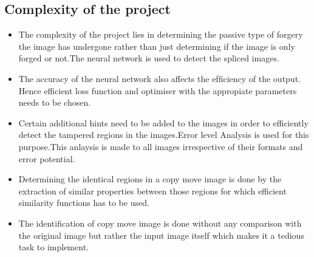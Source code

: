 \subsection{Complexity of the project}
\begin{itemize}
    \item  The complexity of the project lies in determining the passive type of forgery the image has undergone  rather than just determining if the image is only forged or not.The neural network is used to detect the spliced images.
    \item The accuracy of the neural network also affects the efﬁciency of the output. Hence efficient loss function and optimiser with the appropiate parameters needs to be chosen. 
    \item Certain additional hints need to be added to the images in order to efficiently detect the tampered regions in the images.Error level Analysis is used for this purpose.This anlaysis is made to all images irrespective of their formats and error potential.  
    \item Determining the identical regions in a copy move image is done by the extraction of similar properties between those regions for which efficient similarity functions has to be used. 
    \item The identification of copy move image is done without any comparison with the original image but rather the input image itself which makes it a tedious task to implement.
\end{itemize}
